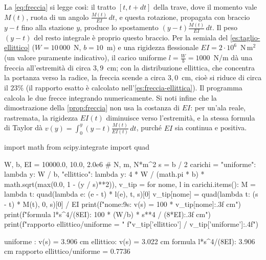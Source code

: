 La \eqref{eq:freccia} si legge così: il tratto $[t,t+dt]$ della trave, dove il momento vale
$M(t)$, ruota di un angolo $\frac{M(t)}{EI}\,dt$, e questa rotazione, propagata con braccio $y-t$
fino alla stazione $y$, produce lo spostamento $(y-t)\frac{M(t)}{EI}\,dt$. Il peso $(y-t)$ del
resto integrale è proprio questo braccio. Per la semiala del
\cref{es:taglio-ellittico} ($W=10\,000$~N, $b=10$~m) e una rigidezza flessionale
$EI=2\cdot10^{6}$~N\,m$^{2}$ (un valore puramente indicativo), il carico uniforme
$l=\frac Wb=1000$~N/m dà una freccia all'estremità di circa $3{,}9$~cm; con la
distribuzione ellittica, che concentra la portanza verso la radice, la freccia scende a
circa $3{,}0$~cm, cioè si riduce di circa il $23\%$ (il rapporto esatto è calcolato
nell'\cref{es:freccia-ellittica}). Il programma calcola le due frecce integrando
numericamente. Si noti infine che la dimostrazione della \cref{prop:freccia} non usa la
costanza di $EI$: per un'ala reale, rastremata, la rigidezza $EI(t)$ diminuisce verso
l'estremità, e la stessa formula di Taylor dà $v(y)=\int_{0}^{y}(y-t)\frac{M(t)}{EI(t)}\,dt$, purché
$EI$ sia continua e positiva.

\begin{python}
import math
from scipy.integrate import quad

W, b, EI = 10000.0, 10.0, 2.0e6            # N, m, N*m^2
s = b / 2
carichi = {
    "uniforme": lambda y: W / b,
    "ellittico": lambda y: 4 * W / (math.pi * b)
                           * math.sqrt(max(0.0, 1 - (y / s)**2)),
}
v_tip = {}
for nome, l in carichi.items():
    M = lambda t: quad(lambda e: (e - t) * l(e), t, s)[0]
    v_tip[nome] = quad(lambda t: (s - t) * M(t), 0, s)[0] / EI
    print(f"{nome:9s}:  v(s) = {100 * v_tip[nome]:.3f} cm")
print(f"formula l*s^4/(8EI): {100 * (W/b) * s**4 / (8*EI):.3f} cm")
print(f"rapporto ellittico/uniforme = "
      f"{v_tip['ellittico'] / v_tip['uniforme']:.4f}")
\end{python}
\begin{risultato}
uniforme :  v(s) = 3.906 cm
ellittico:  v(s) = 3.022 cm
formula l*s^4/(8EI): 3.906 cm
rapporto ellittico/uniforme = 0.7736
\end{risultato}
